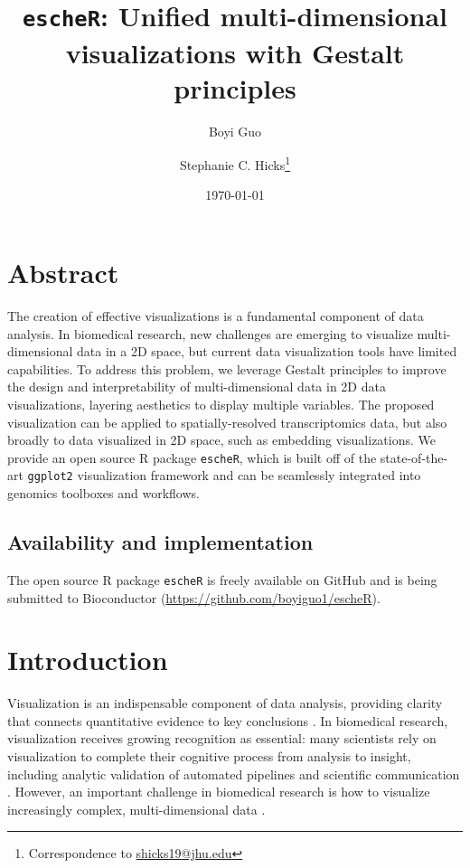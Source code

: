\documentclass[10pt,twocolumn]{article}
\title{\texttt{escheR}: Unified multi-dimensional visualizations with Gestalt principles}
\author[1]{Boyi Guo}
\author[1,2]{Stephanie C. Hicks\thanks{Correspondence to \url{shicks19@jhu.edu}}}
\affil[1]{Department of Biostatistics, Johns Hopkins Bloomberg School of Public Health, MD, USA}
\affil[2]{Malone Center for Engineering in Healthcare, Johns Hopkins University, MD, USA}
\date{\today}
\newcommand{\fixme}[1]{{\color{red} (#1)}}
\begin{document}
\maketitle

\vspace{-.6in}

\section*{Abstract}
The creation of effective visualizations is a fundamental component of data analysis. In biomedical research, new challenges are emerging to visualize multi-dimensional data in a 2D space, but current data visualization tools have limited capabilities. To address this problem, we leverage Gestalt principles to improve the design and interpretability of multi-dimensional data in 2D data visualizations, layering aesthetics to display multiple variables. The proposed visualization can be applied to spatially-resolved transcriptomics data, but also broadly to data visualized in 2D space, such as embedding visualizations. We provide an open source R package \texttt{escheR}, which is built off of the state-of-the-art \texttt{ggplot2} visualization framework and can be seamlessly integrated into genomics toolboxes and workflows.

\subsection*{Availability and implementation}
The open source R package \texttt{escheR} is freely available on GitHub and is being submitted to Bioconductor (\href{https://github.com/boyiguo1/escheR}{https://github.com/boyiguo1/escheR}).


\section{Introduction}
Visualization is an indispensable component of data analysis, providing clarity that connects quantitative evidence to key conclusions \cite{dagostinomcgowan_2022}. In biomedical research, visualization receives growing recognition as essential: many scientists rely on visualization to complete their cognitive process from analysis to insight, including analytic validation of automated pipelines and scientific communication \cite{odonoghue_2021}. However, an important challenge in biomedical research is how to visualize increasingly complex, multi-dimensional data \cite{odonoghue_2010}. 
\end{document}
